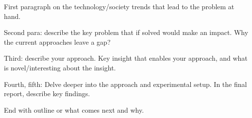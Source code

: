 First paragraph on the technology/society trends that lead 
to the problem at hand.

Second para: describe the key problem that if solved would make
an impact. Why the current approaches leave a gap?

Third: describe your approach. Key insight that enables your approach,
and what is novel/interesting about the insight.

Fourth, fifth: Delve deeper into the approach and experimental setup. 
In the final report, describe key findings.

End with outline or what comes next and why. 
